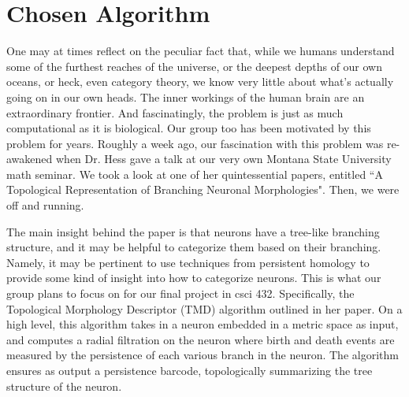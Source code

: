 \documentclass[11pt]{article}
\begin{document}
\maketitle
\section*{Chosen Algorithm}
One may at times reflect on the peculiar fact that, while we humans understand some of the furthest reaches of the universe,
or the deepest depths of our own oceans, or heck, even category theory, we know very little about what's actually going on in our own heads.
The inner workings of the human brain are an extraordinary frontier. And fascinatingly, the problem is just as much computational
 as it is biological. Our group too has been motivated by this problem for years. Roughly a week ago, our fascination with this problem
 was re-awakened when Dr. Hess gave a talk at our very own Montana State University math seminar. We took a look at one of her quintessential papers,
 entitled ``A Topological Representation of Branching Neuronal Morphologies". Then, we were off and running. 
 
 The main insight behind the paper is that neurons have a tree-like branching structure, and it may be helpful to categorize them based on their branching.
 Namely, it may be pertinent to use techniques from persistent homology to provide some kind of insight into how to categorize neurons. This is what our group
 plans to focus on for our final project in csci 432. Specifically, the Topological Morphology Descriptor (TMD) algorithm outlined in her paper. On a high level, this algorithm
 takes in a neuron embedded in a metric space as input, and computes a radial filtration on the neuron where birth and death events are measured by the persistence of each
 various branch in the neuron. The algorithm ensures as output a persistence barcode, topologically summarizing the tree structure of the neuron. 
 
\end{document}
